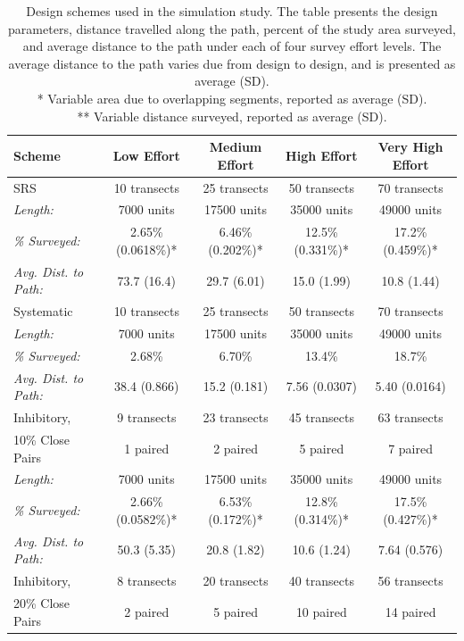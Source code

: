 \documentclass[review]{elsarticle}
\begin{document}
\begin{table}
\caption{Design schemes used in the simulation study. The table presents the
design parameters, distance travelled along the path, percent of the study area
surveyed, and average distance to the path under each of four survey effort
levels. The average distance to the path varies due from design to design, and
is presented as average (SD).\\
* Variable area due to overlapping segments, reported as average (SD).\\
** Variable distance surveyed, reported as average (SD).}
\label{designtable}
\tiny
\begin{tabular}{|l|c|c|c|c|}
\hline
Scheme & Low Effort & Medium Effort & High Effort & Very High Effort \\
\hline
SRS & 10 transects & 25 transects & 50 transects & 70 transects \\
\hfill\emph{Length:} & 7000 units & 17500 units & 35000 units & 49000 units \\
\hfill\emph{\% Surveyed:} & 2.65\% (0.0618\%)* & 6.46\% (0.202\%)* & 12.5\% (0.331\%)* & 17.2\% (0.459\%)* \\
\hfill\emph{Avg. Dist. to Path:} & 73.7 (16.4) & 29.7 (6.01) & 15.0 (1.99) & 10.8 (1.44) \\
\hline
Systematic & 10 transects & 25 transects & 50 transects & 70 transects \\
\hfill\emph{Length:} & 7000 units & 17500 units & 35000 units & 49000 units \\
\hfill\emph{\% Surveyed:} & 2.68\% & 6.70\% & 13.4\% & 18.7\% \\
\hfill\emph{Avg. Dist. to Path:} & 38.4 (0.866) & 15.2 (0.181) & 7.56 (0.0307) & 5.40 (0.0164) \\
\hline
Inhibitory, & 9 transects & 23 transects & 45 transects & 63 transects \\
10\% Close Pairs & 1 paired & 2 paired & 5 paired & 7 paired \\
\hfill\emph{Length:} & 7000 units & 17500 units & 35000 units & 49000 units \\
\hfill\emph{\% Surveyed:} & 2.66\% (0.0582\%)* & 6.53\% (0.172\%)* & 12.8\% (0.314\%)* & 17.5\% (0.427\%)* \\
\hfill\emph{Avg. Dist. to Path:} & 50.3 (5.35) & 20.8 (1.82) & 10.6 (1.24) & 7.64 (0.576) \\
\hline
Inhibitory, & 8 transects & 20 transects & 40 transects & 56 transects \\
20\% Close Pairs & 2 paired & 5 paired & 10 paired & 14 paired \\

\end{tabular}
\end{table}
\end{document}
